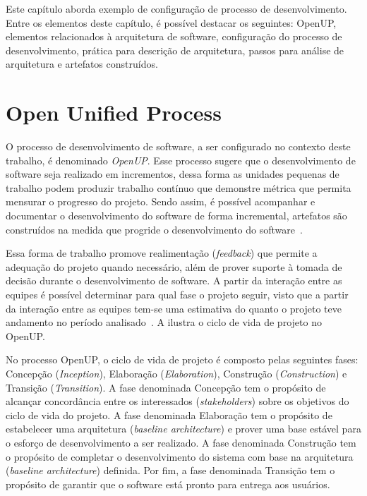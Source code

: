 Este capítulo aborda exemplo de configuração de processo de desenvolvimento. Entre os elementos deste capítulo, é possível destacar os seguintes: \acrfull{OpenUP}, elementos relacionados à arquitetura de software, configuração do processo de desenvolvimento, prática para descrição de arquitetura, passos para análise de arquitetura e artefatos construídos.

\section{Open Unified Process}

O processo de desenvolvimento de software, a ser configurado no contexto deste trabalho, é denominado \emph{\acrfull{OpenUP}}. Esse processo sugere que o desenvolvimento de software seja realizado em incrementos, dessa forma as unidades pequenas de trabalho podem produzir trabalho contínuo que demonstre métrica que permita mensurar o progresso do projeto. Sendo assim, é possível acompanhar e documentar o desenvolvimento do software de forma incremental, artefatos são construídos na medida que progride o desenvolvimento do software~\cite{openup}. 

Essa forma de trabalho promove realimentação (\emph{feedback}) que permite a adequação do projeto quando necessário, além de prover suporte à tomada de decisão durante o desenvolvimento de software. A partir da interação entre as equipes é possível determinar para qual fase o projeto seguir, visto que a partir da interação entre as equipes tem-se uma estimativa do quanto o projeto teve andamento no período analisado~\cite{openup}. A  ilustra o ciclo de vida de projeto no OpenUP.

%

No processo OpenUP, o ciclo de vida de projeto é composto pelas seguintes fases: Concepção (\emph{Inception}), Elaboração (\emph{Elaboration}), Construção (\emph{Construction}) e Transição (\emph{Transition}). A fase denominada  Concepção tem o propósito de alcançar concordância entre os interessados (\emph{stakeholders}) sobre os objetivos do ciclo de vida do projeto. A fase denominada Elaboração tem o propósito de estabelecer uma arquitetura (\emph{baseline architecture}) e prover uma base estável para o esforço de desenvolvimento a ser realizado. A fase denominada Construção tem o propósito de completar o desenvolvimento do sistema com base na arquitetura (\emph{baseline architecture}) definida. Por fim, a fase denominada Transição tem o propósito de garantir que o software está pronto para entrega aos usuários.

